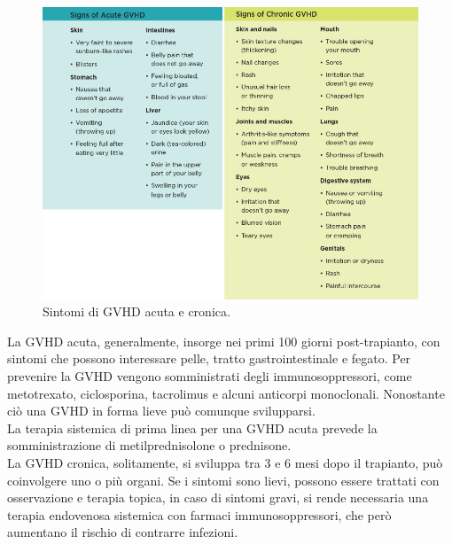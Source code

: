 \begin{figure}[H]
    \begin{center}
    \includegraphics[width=0.7\columnwidth]{img/SignsGVHD.png}
    \vspace{-3mm}
    \end{center}
    \caption{Sintomi di GVHD acuta e cronica.
    \cite{img38}}
    \label{fig:FIGURE_3.17}
\end{figure}

La GVHD acuta, generalmente, insorge nei primi 100 giorni post-trapianto, con sintomi che possono interessare pelle, 
tratto gastrointestinale e fegato. Per prevenire la GVHD vengono somministrati degli immunosoppressori, come 
metotrexato, ciclosporina, tacrolimus e alcuni anticorpi monoclonali. 
Nonostante ciò una GVHD in forma lieve può comunque svilupparsi\cite{STEMCELLS}.\\
La terapia sistemica di prima linea per una GVHD acuta prevede la somministrazione di metilprednisolone o prednisone\cite{GVHD}.\\
La GVHD cronica, solitamente, si sviluppa tra 3 e 6 mesi dopo il trapianto, può coinvolgere uno o più organi. 
Se i sintomi sono lievi, possono essere trattati con osservazione e terapia topica, in caso di sintomi gravi, si rende 
necessaria una terapia endovenosa sistemica con farmaci immunosoppressori, che però aumentano il rischio 
di contrarre infezioni\cite{STEMCELLS}.\\

